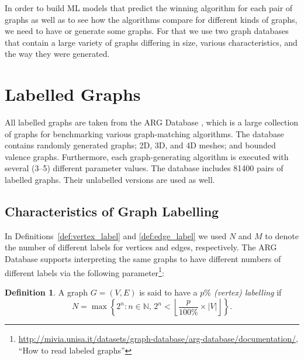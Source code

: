 \documentclass{l4proj}
\theoremstyle{definition}
\newtheorem{definition}{Definition}[chapter]
\theoremstyle{remark}
\begin{document}
In order to build ML models that predict the winning algorithm for each pair of
graphs as well as to see how the algorithms compare for different kinds of
graphs, we need to have or generate some graphs. For that we use two graph
databases that contain a large variety of graphs differing in size, various
characteristics, and the way they were generated.

\section{Labelled Graphs} \label{sec:labelled}

All labelled graphs are taken from the ARG Database \cite{foggia2001-2,
  DBLP:journals/prl/SantoFSV03}, which is a large collection of graphs for
benchmarking various graph-matching algorithms. The database contains randomly
generated graphs; 2D, 3D, and 4D meshes; and bounded valence graphs.
Furthermore, each graph-generating algorithm is executed with several (3--5)
different parameter values. The database includes \num{81400} pairs of labelled
graphs. Their unlabelled versions are used as well.

\subsection{Characteristics of Graph Labelling} \label{sec:characteristics}

In Definitions~\ref{def:vertex_label} and \ref{def:edge_label} we used $N$ and
$M$ to denote the number of different labels for vertices and edges,
respectively. The ARG Database supports interpreting the same graphs to have
different numbers of different labels via the following
parameter\footnote{\url{http://mivia.unisa.it/datasets/graph-database/arg-database/documentation/},
``How to read labeled graphs''}:

\begin{definition} \label{def:percent_labelling}
  A graph $G = (V, E)$ is said to have a \emph{$p\%$ (vertex) labelling} if
  \[ N = \max \left\{ 2^n : n \in \mathbb{N},\, 2^n < \left\lfloor \frac{p}{100\%}
        \times |V| \right\rfloor \right\}. \]
\end{definition}
\end{document}
